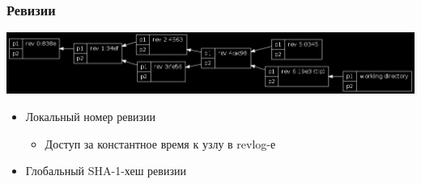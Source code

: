 \documentclass{../cscslides}
\begin{document}
    \begin{frame}
        \frametitle{Ревизии}
        \begin{center}
            \includegraphics[width=\textwidth]{mercurialRevisionsBlack.png}
        \end{center}
        \begin{itemize}
            \item Локальный номер ревизии
            \begin{itemize}
                \item Доступ за константное время к узлу в revlog-е
            \end{itemize}
            \item Глобальный SHA-1-хеш ревизии
        \end{itemize}
    \end{frame}
\end{document}
